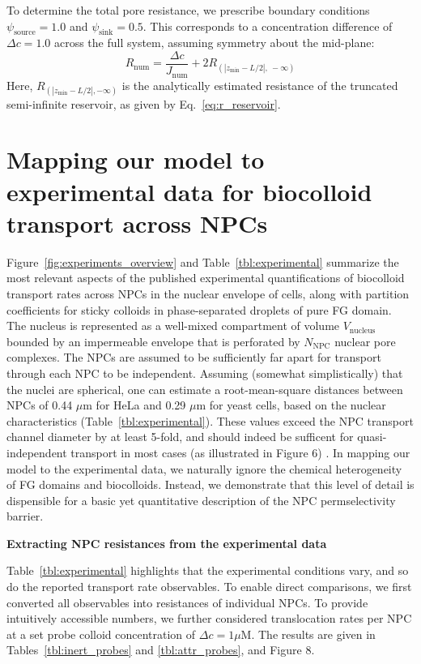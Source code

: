 \documentclass[10pt, a4paper, twocolumn]{article}
\begin{document}
To determine the total pore resistance, we prescribe boundary conditions $\psi_{\text{source}} = 1.0$ and $\psi_{\text{sink}} = 0.5$.
This corresponds to a concentration difference of $\Delta c = 1.0$ across the full system, assuming symmetry about the mid-plane:
\begin{equation}
    R_{\text{num}} = \frac{\Delta c}{J_{\text{num}}} + 2 R_{\left(\left|z_{\text{min}} - L/2\right|,\ -\infty\right)}
\end{equation}
Here, $R_{(|z_{\text{min}} - L/2|, -\infty)}$ is the analytically estimated resistance of the truncated semi-infinite reservoir, as given by Eq.~\eqref{eq:r_reservoir}.


\pagebreak
\section{Mapping our model to experimental data for biocolloid transport across NPCs}

Figure~\ref{fig:experiments_overview} and Table~\ref{tbl:experimental} summarize the most relevant aspects of the published experimental quantifications of biocolloid transport rates across NPCs in the nuclear envelope of cells, along with partition coefficients for sticky colloids in phase-separated droplets of pure FG domain. 
The nucleus is represented as a well-mixed compartment of volume $V_\text{nucleus}$ bounded by an impermeable envelope that is perforated by $N_\text{NPC}$ nuclear pore complexes.
The NPCs are assumed to be sufficiently far apart for transport through each NPC to be independent.
Assuming (somewhat simplistically) that the nuclei are spherical, one can estimate a root-mean-square distances between NPCs of 0.44 $\mu$m for HeLa and 0.29 $\mu$m for yeast cells, based on the nuclear characteristics (Table~\ref{tbl:experimental}).
These values exceed the NPC transport channel diameter by at least 5-fold, and should indeed be sufficent for quasi-independent transport in most cases (as illustrated in Figure 6) \cite{Fabrikant1985}.
In mapping our model to the experimental data, we naturally ignore the chemical heterogeneity of FG domains and biocolloids.
Instead, we demonstrate that this level of detail is dispensible for a basic yet quantitative description of the NPC permselectivity barrier.

\bigskip\noindent
\textbf{Extracting NPC resistances from the experimental data}
    
\noindent
Table~\ref{tbl:experimental} highlights that the experimental conditions vary, and so do the reported transport rate observables.
To enable direct comparisons, we first converted all observables into resistances of individual NPCs.
To provide intuitively accessible numbers, we further considered translocation rates per NPC at a set probe colloid concentration of $\Delta c = 1 \mu \text{M}$.
The results are given in Tables~\ref{tbl:inert_probes} and \ref{tbl:attr_probes}, and Figure 8.
\end{document}
